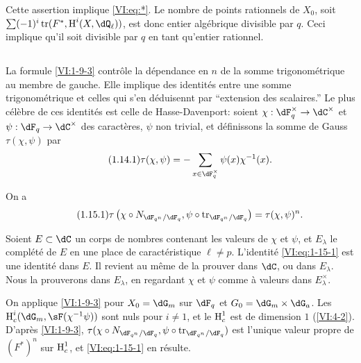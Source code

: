 Cette assertion implique \eqref{VI:eq:*}. Le nombre de points rationnels de 
$X_0$, soit $\sum (-1)^i \tr(F^\ast,\h^i(X,\dQ_\ell))$, est donc entier 
alg\'ebrique divisible par $q$. Ceci implique qu'il soit divisible par $q$ en 
tant qu'entier rationnel. 





\subsection{}\label{VI:1-14}

La formule \ref{VI:1-9-3} contr\^ole la d\'ependance en $n$ de la somme 
trigonom\'etrique au membre de gauche. Elle implique des identit\'es entre une 
somme trigonom\'etrique et celles qui s'en d\'eduisennt par ``extension des 
scalaires.'' Le plus c\'el\`ebre de ces identit\'es est celle de 
Hasse-Davenport: soient $\chi:\dF_q^\times \to \dC^\times$ et 
$\psi:\dF_q\to \dC^\times$ des caract\`eres, $\psi$ non trivial, et 
d\'efinissons la somme de Gauss $\tau(\chi,\psi)$ par 
\begin{equation*}\tag{1.14.1}\label{VI:eq:1-14-1}
  \tau(\chi,\psi) = - \sum_{x\in \dF_q^\times} \psi(x) \chi^{-1}(x) \text{.}
\end{equation*}





\begin{theorem_}\label{VI:1-15}
On a 
\begin{equation*}\tag{1.15.1}\label{VI:eq:1-15-1}
  \tau\left(\chi\circ N_{\dF_{q^n}/\dF_q},\psi\circ \tr_{\dF_{q^n}/\dF_q}\right) = \tau(\chi,\psi)^n \text{.}
\end{equation*}
\end{theorem_}

Soient $E\subset \dC$ un corps de nombres contenant les valeurs de $\chi$ et 
$\psi$, et $E_\lambda$ le compl\'et\'e de $E$ en une place de caract\'eristique 
$\ell\ne p$. L'identit\'e \eqref{VI:eq:1-15-1} est une identit\'e dans $E$. Il 
revient au m\^eme de la prouver dans $\dC$, ou dans $E_\lambda$. Nous la 
prouverons dans $E_\lambda$, en regardant $\chi$ et $\psi$ comme \`a valeurs 
dans $E_\lambda^\times$. 

On applique \ref{VI:1-9-3} pour $X_0=\dG_m$ sur $\dF_q$ et 
$G_0=\dG_m\times \dG_a$. Les $\h_c^i(\dG_m,\sF(\chi^{-1}\psi))$ sont nuls pour 
$i\ne 1$, et le $\operatorname{H}_c^1$ est de dimension $1$ (\ref{VI:4-2}). D'apr\`es 
\ref{VI:1-9-3}, 
$\tau(\chi\circ N_{\dF_{q^n}/\dF_q},\psi\circ \tr_{\dF_{q^n}/\dF_q})$ est 
l'unique valeur propre de $(F^\ast)^n$ sur $\operatorname{H}_c^1$, et \eqref{VI:eq:1-15-1} en 
r\'esulte. 

